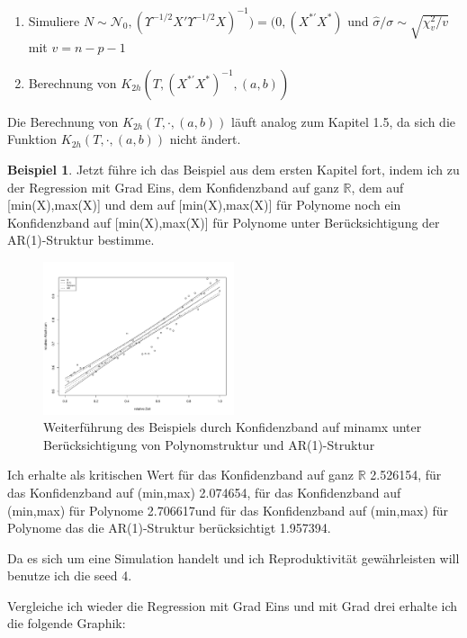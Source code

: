 \documentclass[12pt,a4paper]{article}
\theoremstyle{definition}
\newtheorem{Beispiel}[Definition]{Beispiel}
\theoremstyle{definition}
\theoremstyle{definition}
\newcommand{\cR}{2.526154}
\newcommand{\seedsimulation}{4}
\newcommand{\cA}{2.074654}
\newcommand{\cAP}{2.706617}
\newcommand{\cAPAR}{1.957394}
\begin{document}
\begin{enumerate}
\item Simuliere $N \sim \mathscr{N}_0,(\Upsilon^{-1/2}X'\Upsilon^{-1/2}X)^{-1}) = (0,(X^{*'}X^{*})$ und $\hat{\sigma}/\sigma \sim \sqrt{\chi^2_v/v}$ mit $v=n-p-1$
\item Berechnung von $K_{2h}(T,(X^{*'}X^{*})^{-1},(a,b))$
\end{enumerate}

Die Berechnung von $K_{2h}(T,\cdot,(a,b))$ läuft analog zum Kapitel 1.5, da sich die Funktion $K_{2h}(T,\cdot,(a,b))$ nicht ändert.

\begin{Beispiel}
Jetzt führe ich das Beispiel aus dem ersten Kapitel fort, indem ich zu der Regression mit Grad Eins, dem Konfidenzband auf ganz $\mathbb{R}$, dem auf [min(X),max(X)] und dem auf [min(X),max(X)] für Polynome noch ein Konfidenzband auf [min(X),max(X)] für Polynome unter Berücksichtigung der AR(1)-Struktur bestimme.

\begin{figure}[H] 
  \centering
     \includegraphics[width=0.5\textwidth]{Bsp-KB-poly-AR}
  \caption{Weiterführung des Beispiels durch Konfidenzband auf minamx unter Berücksichtigung von Polynomstruktur und AR(1)-Struktur}
  \label{Bsp-KB-poly-AR}
\end{figure}

Ich erhalte als kritischen Wert für das Konfidenzband auf ganz $\mathbb{R}$ \cR , für das Konfidenzband auf (min,max) \cA, für das Konfidenzband auf (min,max) für Polynome \cAP und für das Konfidenzband auf (min,max) für Polynome das die AR(1)-Struktur berücksichtigt \cAPAR . 

Da es sich um eine Simulation handelt und ich Reproduktivität gewährleisten will benutze ich die seed \seedsimulation . 

Vergleiche ich wieder die Regression mit Grad Eins und mit Grad drei erhalte ich die folgende Graphik:


\end{Beispiel}
\end{document}
